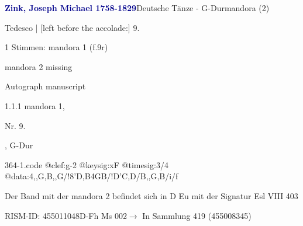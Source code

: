 \documentclass[twocolumn, 12pt]{book}
\begin{document}
\par \vspace{16pt} \textcolor{darkblue}{\textbf{Zink, Joseph Michael  1758-1829}}\hfillplus{\textbf{[364]}}\newline Deutsche Tänze - G-Dur\newline mandora (2)
\par \begin{itshape}[f.9r, at left:] Tedesco | [left before the accolade:] 9.\end{itshape} 
\par \textcolor{darkblue}{}  1 Stimmen: mandora 1  (f.9r)\newline \begin{small} mandora 2 missing\end{small} \newline Autograph manuscript
\par 1.1.1  mandora 1, \begin{itshape}Nr. 9.\end{itshape}, G-Dur  
\begin{filecontents*}{364-1.code}
@clef:g-2
@keysig:xF
@timesig:3/4
@data:4,,G,B,,G/!8'D,B4GB/!D'C,D/B,,G,B/i/f
\end{filecontents*}
\newline %
\par Der Band mit der mandora 2 befindet sich in D Eu mit der Signatur Esl VIII 403
\par RISM-ID: 455011048\newline D-Fh  Ms 002\newline $\rightarrow$ In Sammlung 419 (455008345)
      
\end{document}
